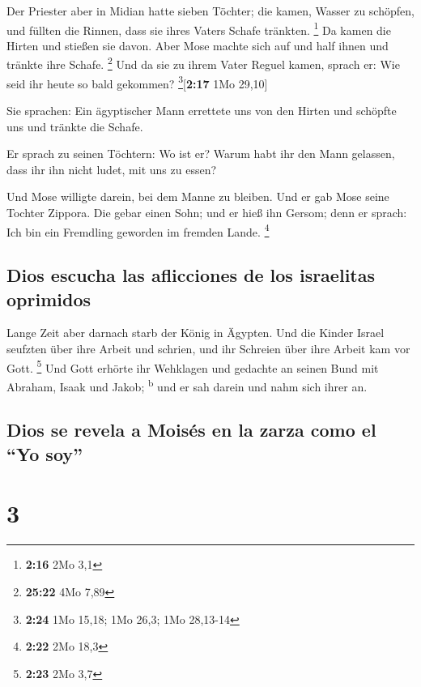  Der Priester aber in Midian hatte sieben Töchter; die
kamen, Wasser zu schöpfen, und füllten die Rinnen, dass sie ihres Vaters
Schafe tränkten. \footnote{\textbf{2:16} 2Mo 3,1}  Da
kamen die Hirten und stießen sie davon. Aber Mose machte sich auf und
half ihnen und tränkte ihre Schafe. \footnote{\textbf{25:22} 4Mo 7,89}
 Und da sie zu ihrem Vater Reguel kamen, sprach er: Wie
seid ihr heute so bald gekommen? \footnote{\textbf{2:24} 1Mo 15,18; 1Mo
  26,3; 1Mo 28,13-14}{[}\textbf{2:17} 1Mo 29,10{]}

 Sie sprachen: Ein ägyptischer Mann errettete uns von den
Hirten und schöpfte uns und tränkte die Schafe.

 Er sprach zu seinen Töchtern: Wo ist er? Warum habt ihr
den Mann gelassen, dass ihr ihn nicht ludet, mit uns zu essen?

 Und Mose willigte darein, bei dem Manne zu bleiben. Und
er gab Mose seine Tochter Zippora.  Die gebar einen Sohn;
und er hieß ihn Gersom; denn er sprach: Ich bin ein Fremdling geworden
im fremden Lande. \footnote{\textbf{2:22} 2Mo 18,3}

\hypertarget{dios-escucha-las-aflicciones-de-los-israelitas-oprimidos}{%
\subsection{Dios escucha las aflicciones de los israelitas
oprimidos}\label{dios-escucha-las-aflicciones-de-los-israelitas-oprimidos}}

 Lange Zeit aber darnach starb der König in Ägypten. Und
die Kinder Israel seufzten über ihre Arbeit und schrien, und ihr
Schreien über ihre Arbeit kam vor Gott. \footnote{\textbf{2:23} 2Mo 3,7}
 Und Gott erhörte ihr Wehklagen und gedachte an seinen
Bund mit Abraham, Isaak und Jakob; \textsuperscript{b} 
und er sah darein und nahm sich ihrer an.

\hypertarget{dios-se-revela-a-moisuxe9s-en-la-zarza-como-el-yo-soy}{%
\subsection{Dios se revela a Moisés en la zarza como el ``Yo
soy''}\label{dios-se-revela-a-moisuxe9s-en-la-zarza-como-el-yo-soy}}

\hypertarget{section-2}{%
\section{3}\label{section-2}}

